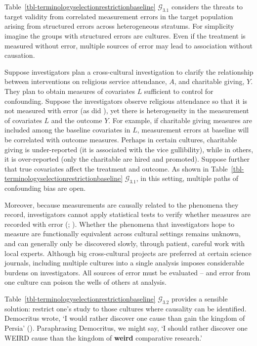 \documentclass[
  single column]{article}
\begin{document}
Table~\ref{tbl-terminologyselectionrestrictionbaseline}
\(\mathcal{G}_{3.1}\) considers the threats to target validity from
correlated measurement errors in the target population arising from
structured errors across heterogeneous stratums. For simplicity imagine
the groups with structured errors are cultures. Even if the treatment is
measured without error, multiple sources of error may lead to
association without causation.

Suppose investigators plan a cross-cultural investigation to clarify the
relationship between interventions on religious service attendance,
\(A\), and charitable giving, \(Y\). They plan to obtain measures of
covariates \(L\) sufficient to control for confounding. Suppose the
investigators observe religious attendance so that it is not measured
with error (as did ), yet there is heterogeneity in the measurement of covariates
\(L\) and the outcome \(Y\). For example, if charitable giving measures
are included among the baseline covariates in \(L\), measurement errors
at baseline will be correlated with outcome measures. Perhaps in certain
cultures, charitable giving is under-reported (it is associated with the
vice gullibility), while in others, it is over-reported (only the
charitable are hired and promoted). Suppose further that true covariates
affect the treatment and outcome. As shown in
Table~\ref{tbl-terminologyselectionrestrictionbaseline}
\(\mathcal{G}_{3.1}\), in this setting, multiple paths of confounding
bias are open.

Moreover, because measurements are causally related to the phenomena
they record, investigators cannot apply statistical tests to verify
whether measures are recorded with error
(;
). Whether
the phenomena that investigators hope to measure are functionally
equivalent across cultural settings remains unknown, and can generally
only be discovered slowly, through patient, careful work with local
experts. Although big cross-cultural projects are preferred at certain
science journals, including multiple cultures into a single analysis
imposes considerable burdens on investigators. All sources of error must
be evaluated -- and error from one culture can poison the wells of
others at analysis.

Table~\ref{tbl-terminologyselectionrestrictionbaseline}
\(\mathcal{G}_{3.2}\) provides a sensible solution: restrict one's study
to those cultures where causality can be identified. Democritus wrote,
`I would rather discover one cause than gain the kingdom of Persia'
(). Paraphrasing
Democritus, we might say, `I should rather discover one WEIRD cause than
the kingdom of \textbf{weird} comparative research.'
\end{document}
